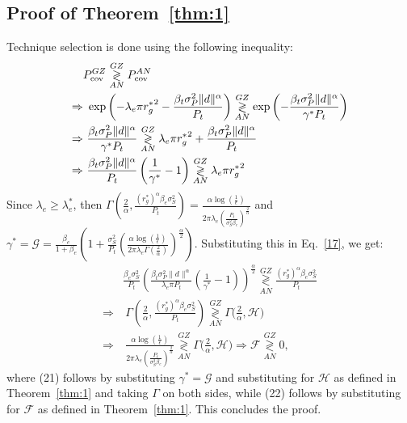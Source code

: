 \documentclass[final]{IEEEtran}
\begin{document}
\subsection{Proof of Theorem~\ref{thm:1}}\label{app:1}
Technique selection is done using the following inequality:
\begin{align}
\label{17}
&P_{\rm cov}^{GZ}\underset{AN}{\overset{GZ}{\gtrless}}P_{\rm cov}^{AN}\nonumber\\
\Rightarrow&\ \exp\left(-\lambda_e\pi {r_g^{*}}^2-\frac{\beta_t\sigma^2_P\|d\|^{\alpha}}{P_t}\right)\underset{AN}{\overset{GZ}{\gtrless}}\exp\left(-\frac{\beta_t\sigma^2_P\|d\|^{\alpha}}{\gamma^{*} P_t}\right)\nonumber\\
\Rightarrow&\ \frac{\beta_t\sigma^2_P\|d\|^{\alpha}}{\gamma^{*} P_t}\underset{AN}{\overset{GZ}{\gtrless}} \lambda_e\pi {r_g^{*}}^2+\frac{\beta_t\sigma^2_P\|d\|^{\alpha}}{P_t}\nonumber\\ 
\Rightarrow&\ \frac{\beta_t\sigma^2_P\|d\|^{\alpha}}{P_t}\left(\frac{1}{\gamma^{*}}-1\right)\underset{AN}{\overset{GZ}{\gtrless}} \lambda_e\pi {r_g^{*}}^2 
\end{align}
Since $\lambda_e\geq\lambda_e^{*}$, then $\Gamma\left(\frac{2}{\alpha},\frac{(r_g^*)^{\alpha}\beta_e\sigma_S^2}{P_t}\right)=\frac{\alpha\log\left(\frac{1}{\epsilon}\right)}{2\pi\lambda_{e}\left(\frac{P_{t}}{\sigma_S^2\beta_e}\right)^{\frac{2}{\alpha}}}$ and $\gamma^{*}=\mathcal{G}=\frac{\beta_e}{1+\beta_e}\left(1+\frac{\sigma_S^2}{P_t}\left(\frac{\alpha \log\left(\frac{1}{\epsilon}\right)}{2\pi\lambda_e\Gamma(\frac{2}{\alpha})}\right)^{\frac{\alpha}{2}}\right)$. Substituting this in Eq.~\ref{17}, we get: 
\begin{align}
\label{18}
&\frac{\beta_e\sigma_S^2}{P_t}\left(\frac{\beta_t\sigma^2_P\|d\|^{\alpha}}{\lambda_e\pi P_t}\left(\frac{1}{\gamma^{*}}-1\right)\right)^{\frac{\alpha}{2}}\underset{AN}{\overset{GZ}{\gtrless}} \frac{(r_g^*)^{\alpha}\beta_e\sigma_S^2}{P_t}\nonumber\\
\Rightarrow&\ \Gamma\left(\frac{2}{\alpha},\frac{(r_g^*)^{\alpha}\beta_e\sigma_S^2}{P_t}\right) \underset{AN}{\overset{GZ}{\gtrless}}\Gamma\Bigg(\frac{2}{\alpha},\mathcal{H}\Bigg)\\
\Rightarrow&\ \frac{\alpha\log\left(\frac{1}{\epsilon}\right)}{2\pi\lambda_{e}\left(\frac{P_{t}}{\sigma_S^2\beta_e}\right)^{\frac{2}{\alpha}}} \underset{AN}{\overset{GZ}{\gtrless}}\Gamma\Bigg(\frac{2}{\alpha},\mathcal{H}\Bigg)\Rightarrow \mathcal{F} \underset{AN}{\overset{GZ}{\gtrless}} 0,
\end{align}
where (21) follows by substituting $\gamma^{*}=\mathcal{G}$ and substituting for $\mathcal{H}$ as defined in Theorem~\ref{thm:1} and taking $\Gamma$ on both sides, while (22) follows by substituting for $\mathcal{F}$ as defined in Theorem~\ref{thm:1}. This concludes the proof.
\vspace{-3mm}


\end{document}
